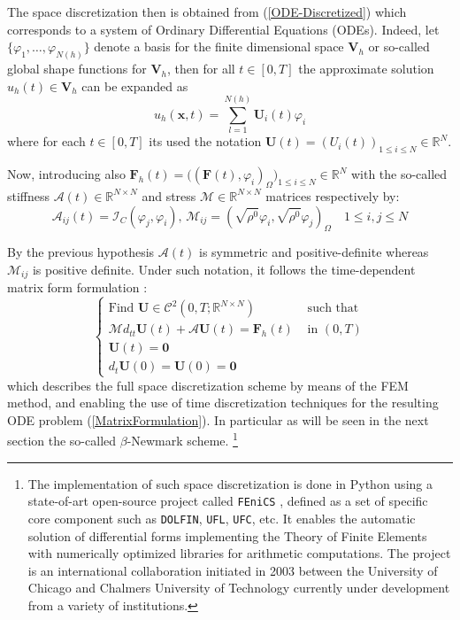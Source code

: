 The space discretization then is obtained from (\ref{ODE-Discretized}) which corresponds to a system of Ordinary Differential Equations (ODEs). Indeed, let $\{ \varphi_1, \dots, \varphi_{N(h)} \}$ denote a basis for the finite dimensional space $\mathbf{V}_h$ or so-called global shape functions for $\mathbf{V}_h$, then for all $t \in [0,T]$ the approximate solution $u_h(t) \in \mathbf{V}_h$ can be expanded as
\begin{equation*}
    u_h(\mathbf{x},t) = \sum \limits_{l=1}^{N(h)} \mathbf{U}_i(t) \varphi_i
\end{equation*}
where for each $t \in [0,T]$ its used the notation $\mathbf{U}(t) = (U_i(t))_{1 \leq i \leq N} \in \mathbb{R}^N$.

Now, introducing also $\mathbf{F}_h(t) = \big( (\mathbf{F}(t), \varphi_i)_{\Omega} \big)_{1 \leq i \leq N}\in \mathbb{R}^N$ with the so-called stiffness $\mathcal{A}(t) \in \mathbb{R}^{N \times N}$ and stress $\mathcal{M} \in \mathbb{R}^{N \times N}$ matrices respectively by:
\begin{equation*}
    \mathcal{A}_{ij}(t) = \mathcal{I}_C(\varphi_j, \varphi_i), \, \mathcal{M}_{ij} = (\sqrt{\rho^0} \varphi_i , \sqrt{\rho^0}\varphi_j)_{\Omega} \quad 1 \leq i,j \leq N
\end{equation*}

By the previous hypothesis $\mathcal{A}(t)$ is symmetric and positive-definite whereas $\mathcal{M}_{ij}$ is positive definite. Under such notation, it follows the time-dependent matrix form formulation :
\begin{equation}
    \label{MatrixFormulation}
    \left \{
    \begin{array}{cc}
        \text{Find } \mathbf{U} \in \mathcal{C}^2(0,T; \mathbb{R}^{N\times N}) & \text{ such that} \\
        \mathcal{M} d_{tt} \mathbf{U}(t) + \mathcal{A}\mathbf{U}(t) = \mathbf{F}_h (t) & \text{ in }(0,T)\\ 
        \mathbf{U}(t) = \mathbf{0} & \\
        d_{t} \mathbf{U}(0) = \mathbf{U}(0)  = \mathbf{0}&
    \end{array}
    \right.
\end{equation}
which describes the full space discretization scheme by means of the FEM method, and enabling the use of time discretization techniques for the resulting ODE problem (\ref{MatrixFormulation}). In particular as will be seen in the next section the so-called $\beta$-Newmark scheme. \footnote{The implementation of such space discretization is done in Python using a state-of-art open-source project called \texttt{FEniCS} \cite{logg2012automated}, defined as a set of specific core component such as \texttt{DOLFIN}, \texttt{UFL},  \texttt{UFC}, etc. It enables the automatic solution of differential forms implementing the Theory of Finite Elements with numerically optimized libraries for arithmetic computations. The project is an international collaboration initiated in 2003 between the University of Chicago and Chalmers University of Technology currently under development from a variety of institutions.}

